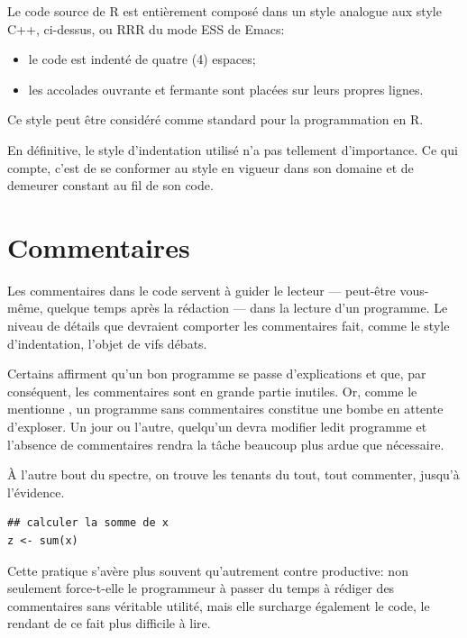 Le code source de R est entièrement composé dans un style analogue aux
style C++, ci-dessus, ou RRR du mode ESS de Emacs:
\begin{itemize}
\item le code est indenté de quatre (4) espaces;
\item les accolades ouvrante et fermante sont placées sur leurs
  propres lignes.
\end{itemize}
Ce style peut être  considéré comme standard pour la programmation en
R.

En définitive, le style d'indentation utilisé n'a pas tellement
d'importance. Ce qui compte, c'est de se conformer au style en vigueur
dans son domaine et de demeurer constant au fil de son code.



\section{Commentaires}
\label{sec:collaboration:commentaires}

Les commentaires dans le code servent à guider le
lecteur --- peut-être vous-même, quelque temps après la rédaction ---
dans la lecture d'un programme. Le niveau de détails que devraient
comporter les commentaires fait, comme le style d'indentation, l'objet
de vifs débats.

Certains affirment qu'un bon programme se passe d'explications et que,
par conséquent, les commentaires sont en grande partie inutiles. Or,
comme le mentionne \citet{Oualline:C:1997}, un programme sans
commentaires constitue une bombe en attente d'exploser. Un jour ou
l'autre, quelqu'un devra modifier ledit programme et l'absence de
commentaires rendra la tâche beaucoup plus ardue que nécessaire.

À l'autre bout du spectre, on trouve les tenants du tout, tout
commenter, jusqu'à l'évidence.
\begin{Schunk}
\begin{Verbatim}
## calculer la somme de x
z <- sum(x)
\end{Verbatim}
\end{Schunk}
Cette pratique s'avère plus souvent qu'autrement contre productive:
non seulement force-t-elle le programmeur à passer du temps à rédiger
des commentaires sans véritable utilité, mais elle surcharge également
le code, le rendant de ce fait plus difficile à lire.


